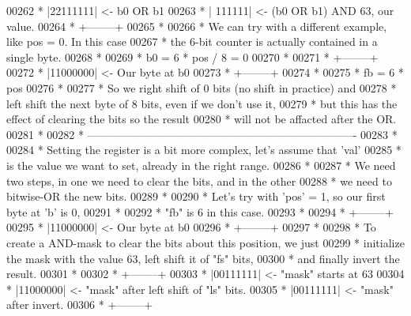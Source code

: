 \begin{DoxyCode}
{00262 \textcolor{comment}{ *   |22111111|  <- b0 OR b1}
00263 \textcolor{comment}{ *   |  111111|  <- (b0 OR b1) AND 63, our value.}
00264 \textcolor{comment}{ *   +--------+}
00265 \textcolor{comment}{ *}
00266 \textcolor{comment}{ * We can try with a different example, like pos = 0. In this case}
00267 \textcolor{comment}{ * the 6-bit counter is actually contained in a single byte.}
00268 \textcolor{comment}{ *}
00269 \textcolor{comment}{ *  b0 = 6 * pos / 8 = 0}
00270 \textcolor{comment}{ *}
00271 \textcolor{comment}{ *   +--------+}
00272 \textcolor{comment}{ *   |11000000|  <- Our byte at b0}
00273 \textcolor{comment}{ *   +--------+}
00274 \textcolor{comment}{ *}
00275 \textcolor{comment}{ *  fb = 6 * pos %
00276 \textcolor{comment}{ *}
00277 \textcolor{comment}{ *  So we right shift of 0 bits (no shift in practice) and}
00278 \textcolor{comment}{ *  left shift the next byte of 8 bits, even if we don't use it,}
00279 \textcolor{comment}{ *  but this has the effect of clearing the bits so the result}
00280 \textcolor{comment}{ *  will not be affacted after the OR.}
00281 \textcolor{comment}{ *}
00282 \textcolor{comment}{ * -------------------------------------------------------------------------}
00283 \textcolor{comment}{ *}
00284 \textcolor{comment}{ * Setting the register is a bit more complex, let's assume that 'val'}
00285 \textcolor{comment}{ * is the value we want to set, already in the right range.}
00286 \textcolor{comment}{ *}
00287 \textcolor{comment}{ * We need two steps, in one we need to clear the bits, and in the other}
00288 \textcolor{comment}{ * we need to bitwise-OR the new bits.}
00289 \textcolor{comment}{ *}
00290 \textcolor{comment}{ * Let's try with 'pos' = 1, so our first byte at 'b' is 0,}
00291 \textcolor{comment}{ *}
00292 \textcolor{comment}{ * "fb" is 6 in this case.}
00293 \textcolor{comment}{ *}
00294 \textcolor{comment}{ *   +--------+}
00295 \textcolor{comment}{ *   |11000000|  <- Our byte at b0}
00296 \textcolor{comment}{ *   +--------+}
00297 \textcolor{comment}{ *}
00298 \textcolor{comment}{ * To create a AND-mask to clear the bits about this position, we just}
00299 \textcolor{comment}{ * initialize the mask with the value 63, left shift it of "fs" bits,}
00300 \textcolor{comment}{ * and finally invert the result.}
00301 \textcolor{comment}{ *}
00302 \textcolor{comment}{ *   +--------+}
00303 \textcolor{comment}{ *   |00111111|  <- "mask" starts at 63}
00304 \textcolor{comment}{ *   |11000000|  <- "mask" after left shift of "ls" bits.}
00305 \textcolor{comment}{ *   |00111111|  <- "mask" after invert.}
00306 \textcolor{comment}{ *   +--------+}
}}
\end{DoxyCode}
